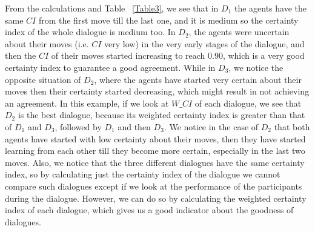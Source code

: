 \begin{example}
From the calculations and Table ~\ref{Table3}, we see that in $D_1$ the agents have the same $CI$ from the first move
till the last one, and it is medium so the certainty index of the whole dialogue is medium too. In $D_2$, the agents were
uncertain about their moves (i.e. $CI$ very low) in the very early stages of the dialogue, and then the $CI$ of their moves started
increasing to reach 0.90, which is a very good certainty index to guarantee a good agreement. While in $D_3$, we notice the opposite
situation of $D_2$, where the agents have started very certain about their moves then their certainty started decreasing, which might
result in not achieving an agreement. In this example, if we look at $W\_CI$ of each dialogue, we see that $D_2$ is the best dialogue,
because its weighted certainty index is greater than that of $D_1$ and $D_3$, followed by $D_1$ and then $D_3$. We notice in the case
of $D_2$ that both agents have started with low certainty about their moves, then they have started learning from each other till they
become more certain, especially in the last two moves. Also, we notice that the three different dialogues have the same certainty index,
so by calculating just the certainty index of the dialogue we cannot compare such dialogues except if we look at the performance of the
participants during the dialogue. However, we can do so by calculating the weighted certainty index of each dialogue, which gives us a
good indicator about the goodness of dialogues.




\end{example}
